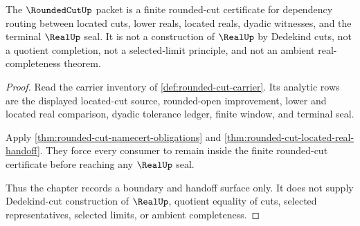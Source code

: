 \begin{theorem}
\label{thm:rounded-cut-no-dedekind-completion}
The $\RoundedCutUp$ packet is a finite rounded-cut certificate for dependency routing between located cuts, lower reals, located reals, dyadic witnesses, and the terminal $\RealUp$ seal. It is not a construction of $\RealUp$ by Dedekind cuts, not a quotient completion, not a selected-limit principle, and not an ambient real-completeness theorem.
\end{theorem}
\begin{proof}
Read the carrier inventory of \autoref{def:rounded-cut-carrier}. Its analytic rows are the displayed located-cut source, rounded-open improvement, lower and located real comparison, dyadic tolerance ledger, finite window, and terminal seal.

Apply \autoref{thm:rounded-cut-namecert-obligations} and \autoref{thm:rounded-cut-located-real-handoff}. They force every consumer to remain inside the finite rounded-cut certificate before reaching any $\RealUp$ seal.

Thus the chapter records a boundary and handoff surface only. It does not supply Dedekind-cut construction of $\RealUp$, quotient equality of cuts, selected representatives, selected limits, or ambient completeness.
\end{proof}




